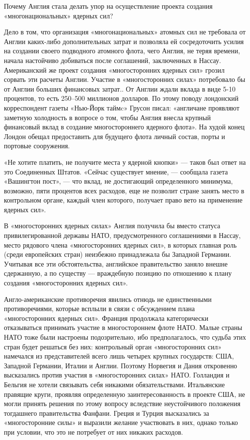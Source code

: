 \documentclass[12pt, a4paper, openany]{book}
\begin{document}
Почему Англия стала делать упор на осуществление проекта создания «многонациональных» ядерных сил?

Дело в том, что организация «многонациональных» атомных сил не требовала от Англии каких-либо дополнительных затрат и позволяла ей сосредоточить усилия на создании своего подводного атомного флота, чего Англия, не теряя времени, начала настойчиво добиваться после соглашений, заключенных в Нассау. Американский же проект создания «многосторонних ядерных сил» грозил сорвать эти расчеты Англии. Участие в «многосторонних силах» потребовало бы от Англии больших финансовых затрат.. От Англии ждали вклада в виде 5-10 процентов, то есть 250–500 миллионов долларов. По этому поводу лондонский корреспондент газеты «Нью-Йорк таймc» Грусон писал: «англичане проявляют заметную холодность в вопросе о том, чтобы Англия внесла крупный финансовый вклад в создание многостороннего ядерного флота». На худой конец Лондон обещал предоставить для будущего флота личный состав, порты и портовые сооружения.

«Не хотите платить, не получите места у ядерной кнопки» — таков был ответ на это Соединенных Штатов. «Сейчас существует мнение, — сообщала газета «Вашингтон пост», — что вклад, не достигающий определенного минимума, возможно, пяти процентов всех расходов, еще не позволит стране занять место в контрольном органе, каждый член которого, получает право вето на применение ядерных сил».

В «многосторонних ядерных силах» Англия получила бы вместо статуса привилегированной державы НАТО, предусмотренного соглашениями в Нассау, место рядового члена «многосторонних ядерных сил», в которых главная роль (среди европейских стран) неизбежно принадлежала бы Западной Германии. Учитывая все эти обстоятельства, английское правительство заняло внешне сдержанную, а по существу — враждебную позицию по отношению к плану создания «многосторонних ядерных сил».

Англо-американские противоречия явились отнюдь не единственными противоречиями, которые всплыли в связи с обсуждением плана «многосторонних ядерных сил». Франция продолжала категорически отказываться принимать участие в многостороннем флоте НАТО. Малые страны НАТО тоже были настроены подозрительно, ибо предполагалось, что судьба этих стран будет решаться без них: контрольный орган «многосторонних сил» намечался из представителей всего лишь четырех крупных государств: США, Западной Германии, Италии и Англии. Поэтому Норвегия и Дания откровенно высказались против участия в «многосторонних силах» НАТО. Голландия и Бельгия не хотели связывать себя никакими обязательствами. Итальянские правящие круги, проявляя определенную заинтересованность в проекте США, не могли принять решения по этому вопросу вследствие неустойчивого положения тогдашнего правительства Фанфани. Греция и Турция высказались за «многосторонние силы» и выразили желание участвовать в них, однако только при условии, что это не потребует от них никаких расходов.
\end{document}
